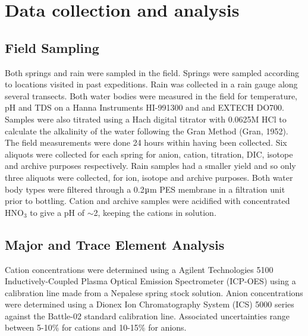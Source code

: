 
\section{Data collection and analysis}



\subsection{Field Sampling}
Both springs and rain were sampled in the field. Springs were sampled according to locations visited in past expeditions. Rain was collected in a rain gauge along several transects. Both water bodies were measured in the field for temperature, pH and TDS on a Hanna Instruments HI-991300 and and EXTECH DO700. Samples were also titrated using a Hach digital titrator with 0.0625M HCl to calculate the alkalinity of the water following the Gran Method (Gran, 1952). The field measurements were done 24 hours within having been collected.  Six aliquots were collected for each spring for anion, cation, titration, DIC, isotope and archive purposes respectively.  Rain samples had a smaller yield and so only three aliquots were collected, for ion, isotope and archive purposes. Both water body types were filtered through a 0.2$\micro$m PES membrane in a filtration unit prior to bottling. Cation and archive samples were acidified with concentrated HNO$_3$ to give a pH of $\sim$2, keeping the cations in solution. 






\subsection{Major and Trace Element Analysis}

Cation concentrations were determined using a Agilent Technologies 5100 Inductively-Coupled Plasma Optical Emission Spectrometer (ICP-OES) using a calibration line made from a Nepalese spring stock solution.
Anion concentrations were determined using a Dionex Ion Chromatography System (ICS) 5000 series against the Battle-02 standard calibration line. Associated uncertainties range between 5-10\% for cations and 10-15\% for anions.


